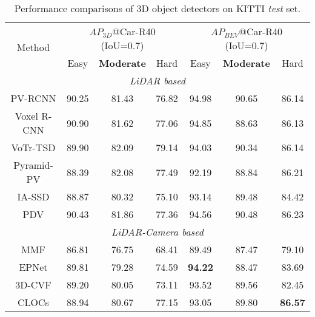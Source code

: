 \documentclass[lettersize,journal]{IEEEtran}
\begin{document}
 \begin{table*}[t]
\setlength{\tabcolsep}{11pt}
\renewcommand{\arraystretch}{1.0}
\centering
\caption{Performance comparisons of 3D object detectors on KITTI \textit{test} set.}
\begin{tabular}{ccccccc}

\cline{1-7}
\multirow{2}{*}{Method} &  \multicolumn{3}{c}{$AP_{3D}$@Car-R40 (IoU=0.7)} & \multicolumn{3}{c}{$AP_{BEV}$@Car-R40 (IoU=0.7)} \\
\cline{2-4}
\cline{5-7}
                          & Easy     & \textbf{Moderate}    & Hard     & Easy      & \textbf{Moderate}    & Hard     \\
\cline{1-7}
\multicolumn{7}{c}{\textit{LiDAR based}}                                                                                \\
\cline{1-7}
PV-RCNN\cite{pvrcnn}           & 90.25    & 81.43                & 76.82    & 94.98     & 90.65                & 86.14    \\
Voxel R-CNN\cite{voxelrcnn}       & 90.90    & 81.62                & 77.06    & 94.85     & 88.63                & 86.13    \\
VoTr-TSD\cite{votr}      & 89.90    & 82.09                & 79.14    & 94.03     & 90.34                & 86.14    \\
Pyramid-PV\cite{pyramid}        & 88.39    & 82.08                & 77.49    & 92.19     & 88.84                & 86.21    \\
IA-SSD\cite{iassd}            & 88.87    & 80.32                & 75.10    & 93.14     & 89.48                & 84.42    \\
PDV\cite{pdv}           & 90.43    & 81.86                & 77.36    & 94.56     & 90.48                & 86.23    \\
\cline{1-7}
\multicolumn{7}{c}{\textit{LiDAR-Camera based}}                                                                                  \\
\cline{1-7}
MMF\cite{mmf}               & 86.81    & 76.75                & 68.41    & 89.49     & 87.47                & 79.10    \\
EPNet\cite{epnet}         & 89.81    & 79.28                & 74.59    & \textbf{94.22}     & 88.47                & 83.69    \\
3D-CVF\cite{3d-cvf}            & 89.20    & 80.05                & 73.11    & 93.52     & 89.56                & 82.45    \\
CLOCs\cite{clocs}             & 88.94    & 80.67                & 77.15    & 93.05     & 89.80                & \textbf{86.57}    \\

\end{tabular}
\end{table*}
\end{document}
